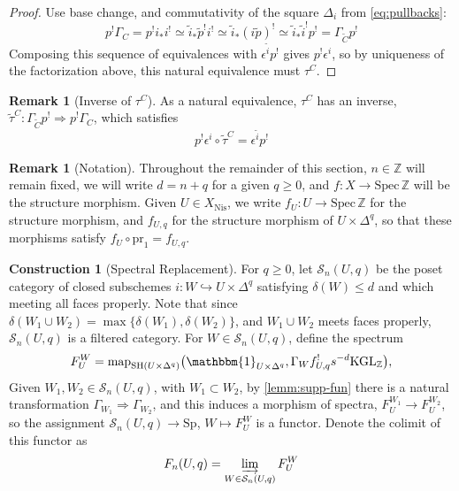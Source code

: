 \documentclass[11pt, twoside]{article}
\numberwithin{equation}{section}
\theoremstyle{definition}
\newtheorem{construction}[equation]{Construction}
\newtheorem{remark}[equation]{Remark}
\newcommand{\bb}[1]{\mathbb{#1}}
\newcommand{\colim}{\varinjlim}
\newcommand{\spec}{\mathrm{Spec} \,}
\newcommand{\pr}{\mathrm{pr}}
\newcommand{\map}{\mathrm{map}}
\newcommand{\Kgl}{\mathrm{KGL}}
\newcommand{\sh}{\mathrm{SH}}
\newcommand{\Sp}{\mathrm{Sp}}
\newcommand{\nis}{\mathrm{Nis}}
\begin{document}
\begin{proof}
Use base change, and commutativity of the square \(\Delta_i\) from \eqref{eq:pullbacks}: 
\[p^! \Gamma_C = p^!i_*i^! \simeq \tilde{i}_* \tilde{p}^!i^! \simeq \tilde{i}_* (i \tilde{p})^! \simeq \tilde{i}_*\tilde{i}^!p^! = \Gamma_{\tilde{C}} p^!\]
Composing this sequence of equivalences with \(\epsilon^{\tilde{i}}p^!\) gives \(p^!\epsilon^i\), so by uniqueness of the factorization above, this natural equivalence must \(\tau^C\).
\end{proof}

\begin{remark}[Inverse of \(\tau^C\)]\label{rem:tau-inv}
As a natural equivalence, \(\tau^C\) has an inverse, \(\tilde{\tau}^C \colon \Gamma_{\tilde{C}} p^! \Longrightarrow p^! \Gamma_C\), which satisfies 
\begin{equation}\label{eq:twid-tau-epsilon}
p^! \epsilon^i \circ \tilde{\tau}^C = \epsilon^{\tilde{i}} p^!
\end{equation}
\end{remark}




\begin{remark}[Notation] Throughout the remainder of this section, \(n \in \bb{Z}\) will remain fixed, we will write \(d = n + q\) for a given \(q \geq 0\), and \(f \colon X \to \spec \bb{Z}\) will be the structure morphism. Given \(U \in X_\nis\), we write \(f_U \colon U \to \spec \bb{Z}\) for the structure morphism, and \(f_{U, q}\) for the structure morphism of \(U \times \Delta^q\), so that these morphisms satisfy \(f_U \circ \pr_1 = f_{U, q}\).
\end{remark}

\begin{construction}[Spectral Replacement]\label{con:spec-rep}
For \(q \geq 0\), let \(\mathcal{S}_n(U, q)\) be the poset category of closed subschemes \(i \colon W \hookrightarrow U \times \Delta^q\) satisfying \(\delta(W) \leq d\) and which meeting all faces properly. Note that since \(\delta(W_1 \cup W_2) = \max \{\delta(W_1), \delta(W_2)\}\), and \(W_1 \cup W_2\) meets faces properly, \(\mathcal{S}_n(U, q)\) is a filtered category. For \(W \in \mathcal{S}_n(U, q)\), define the spectrum 
\[F_U^W = \map_{\sh(U \times \Delta^q)}\big(\mathbbm{1}_{U \times \Delta^q}, \Gamma_W f_{U, q}^! s^{- d} \Kgl_\bb{Z}\big),\]
Given \(W_1, W_2 \in \mathcal{S}_n(U, q)\), with \(W_1 \subset W_2\), by \ref{lemm:supp-fun} there is a natural transformation \(\Gamma_{W_1} \Longrightarrow \Gamma_{W_2}\), and this induces a morphism of spectra, \(F_U^{W_1} \to F_U^{W_2}\), so the assignment \(\mathcal{S}_n(U, q) \to \Sp\), \(W \mapsto F_U^W\) is a functor. Denote the colimit of this functor as 
\[F_n(U, q) = \colim_{W \in \mathcal{S}_n(U, q)} F_U^W\]
\end{construction}
\end{document}
